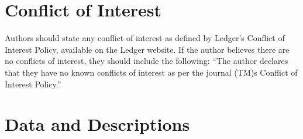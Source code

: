 \documentclass{article}
\begin{document}
\section*{Conflict of Interest}

Authors should state any conflict of interest as defined by Ledger's Conflict of Interest Policy, available on the Ledger website. If the author believes there are no conflicts of interest, they should include the following: ``The author declares that they have no known conflicts of interest as per the journal (TM)s Conflict of Interest Policy.''







\newpage 	


\setcounter{section}{0}
\section{Data and Descriptions}

\vspace{12pt}
\begin{table}[h]
\begin{center} 



\caption{A table in an appendix} \label{AppendixTable}
\end{center}
\end{table} 


\thispagestyle{pagelast}





\end{document}
